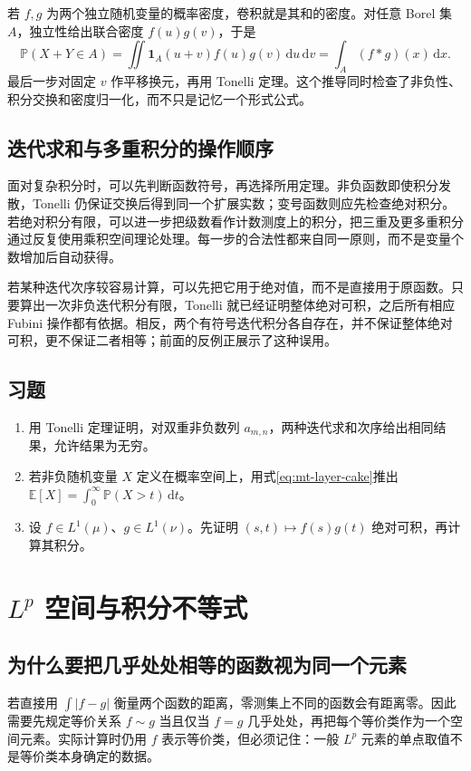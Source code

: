 \documentclass[UTF8,12pt,a4paper,fontset=fandol]{ctexbook}
\begin{document}
若 $f,g$ 为两个独立随机变量的概率密度，卷积就是其和的密度。对任意 Borel 集 $A$，独立性给出联合密度 $f(u)g(v)$，于是
\[
 \mathbb P(X+Y\in A)=\iint\mathbf1_A(u+v)f(u)g(v)\,\mathrm du\,\mathrm dv
 =\int_A(f*g)(x)\,\mathrm dx.
\]
最后一步对固定 $v$ 作平移换元，再用 Tonelli 定理。这个推导同时检查了非负性、积分交换和密度归一化，而不只是记忆一个形式公式。

\section{迭代求和与多重积分的操作顺序}
面对复杂积分时，可以先判断函数符号，再选择所用定理。非负函数即使积分发散，Tonelli 仍保证交换后得到同一个扩展实数；变号函数则应先检查绝对积分。若绝对积分有限，可以进一步把级数看作计数测度上的积分，把三重及更多重积分通过反复使用乘积空间理论处理。每一步的合法性都来自同一原则，而不是变量个数增加后自动获得。

若某种迭代次序较容易计算，可以先把它用于绝对值，而不是直接用于原函数。只要算出一次非负迭代积分有限，Tonelli 就已经证明整体绝对可积，之后所有相应 Fubini 操作都有依据。相反，两个有符号迭代积分各自存在，并不保证整体绝对可积，更不保证二者相等；前面的反例正展示了这种误用。

\section{习题}
\begin{enumerate}
 \item 用 Tonelli 定理证明，对双重非负数列 $a_{m,n}$，两种迭代求和次序给出相同结果，允许结果为无穷。
 \item 若非负随机变量 $X$ 定义在概率空间上，用式\eqref{eq:mt-layer-cake}推出 $\mathbb E[X]=\int_0^\infty\mathbb P(X>t)\,\mathrm dt$。
 \item 设 $f\in L^1(\mu)$、$g\in L^1(\nu)$。先证明 $(s,t)\mapsto f(s)g(t)$ 绝对可积，再计算其积分。
\end{enumerate}

\chapter{$L^p$ 空间与积分不等式}
\label{chap:mt-lp}

\section{为什么要把几乎处处相等的函数视为同一个元素}
若直接用 $\int|f-g|$ 衡量两个函数的距离，零测集上不同的函数会有距离零。因此需要先规定等价关系 $f\sim g$ 当且仅当 $f=g$ 几乎处处，再把每个等价类作为一个空间元素。实际计算时仍用 $f$ 表示等价类，但必须记住：一般 $L^p$ 元素的单点取值不是等价类本身确定的数据。
\end{document}
